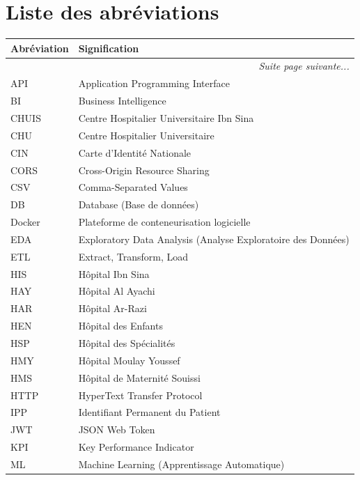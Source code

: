 \documentclass[12pt,a4paper]{report}
\begin{document}
	\chapter*{Liste des abréviations}
	
	\begin{longtable}{p{3.2cm} p{10.5cm}}
		\toprule
		\textbf{Abréviation} & \textbf{Signification} \\
		\midrule
		\endhead
		\midrule
		\multicolumn{2}{r}{\small\itshape Suite page suivante...}\\
		\endfoot
		\bottomrule
		\endlastfoot
		API     & Application Programming Interface \\
		BI      & Business Intelligence \\
		CHUIS   & Centre Hospitalier Universitaire Ibn Sina \\
		CHU     & Centre Hospitalier Universitaire \\
		CIN     & Carte d'Identité Nationale \\
		CORS    & Cross-Origin Resource Sharing \\
		CSV     & Comma-Separated Values \\
		DB      & Database (Base de données) \\
		Docker  & Plateforme de conteneurisation logicielle \\
		EDA     & Exploratory Data Analysis (Analyse Exploratoire des Données) \\
		ETL     & Extract, Transform, Load \\
		HIS     & Hôpital Ibn Sina \\
		HAY     & Hôpital Al Ayachi \\
		HAR     & Hôpital Ar-Razi \\
		HEN     & Hôpital des Enfants \\
		HSP     & Hôpital des Spécialités \\
		HMY     & Hôpital Moulay Youssef \\
		HMS     & Hôpital de Maternité Souissi \\
		HTTP    & HyperText Transfer Protocol \\
		IPP     & Identifiant Permanent du Patient \\
		JWT     & JSON Web Token \\
		KPI     & Key Performance Indicator \\
		ML      & Machine Learning (Apprentissage Automatique) \\

\end{longtable}
\end{document}
